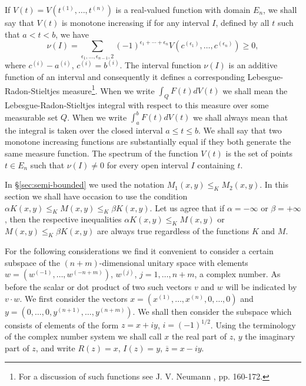 \documentclass{article}
\begin{document}
If $V(t) = V(t^{(1)}, \ldots, t^{(n)})$ is a real-valued function with domain $E_n$, we shall say that $V(t)$ is monotone increasing if for any interval $I$, defined by all $t$ such that $a < t < b$, we have
\begin{equation}
\nu(I) = \sum_{\epsilon_1, \ldots, \epsilon_{n-1}, 2} (-1)^{\epsilon_1 + \cdots + \epsilon_n} V(c^{(\epsilon_1)}, \ldots, c^{(\epsilon_n)}) \geq 0,
\label{eq:monotone-increasing}
\end{equation}
where $c^{(i)} - a^{(i)}$, $c^{(i)} = b^{(i)}$. The interval function $\nu(I)$ is an additive function of an interval and consequently it defines a corresponding Lebesgue-Radon-Stieltjes measure\footnote{For a discussion of such functions see J. V. Neumann \cite{neumann}, pp. 160-172.}. When we write $\int_Q F(t) dV(t)$ we shall mean the Lebesgue-Radon-Stieltjes integral with respect to this measure over some measurable set $Q$. When we write $\int_a^b F(t) dV(t)$ we shall always mean that the integral is taken over the closed interval $a \leq t \leq b$. We shall say that two monotone increasing functions are substantially equal if they both generate the same measure function. The spectrum of the function $V(t)$ is the set of points $t \in E_n$ such that $\nu(I) \neq 0$ for every open interval $I$ containing $t$.

In §\ref{sec:semi-bounded} we used the notation $M_1(x, y) \leq_K M_2(x, y)$. In this section we shall have occasion to use the condition $\alpha K(x, y) \leq_K M(x, y) \leq_K \beta K(x, y)$. Let us agree that if $\alpha = -\infty$ or $\beta = +\infty$, then the respective inequalities $\alpha K(x, y) \leq_K M(x, y)$ or $M(x, y) \leq_K \beta K(x, y)$ are always true regardless of the functions $K$ and $M$.

For the following considerations we find it convenient to consider a certain subspace of the $(n + m)$-dimensional unitary space with elements $w = (w^{(-1)}, \ldots, w^{(-n+m)})$, $w^{(j)}$, $j = 1, \ldots, n + m$, a complex number. As before the scalar or dot product of two such vectors $v$ and $w$ will be indicated by $v \cdot w$. We first consider the vectors $x = (x^{(1)}, \ldots, x^{(n)}, 0, \ldots, 0)$ and $y = (0, \ldots, 0, y^{(n+1)}, \ldots, y^{(n+m)})$. We shall then consider the subspace which consists of elements of the form $z = x + iy$, $i = (-1)^{1/2}$. Using the terminology of the complex number system we shall call $x$ the real part of $z$, $y$ the imaginary part of $z$, and write $R(z) = x$, $I(z) = y$, $\overline{z} = x - iy$.
\end{document}
